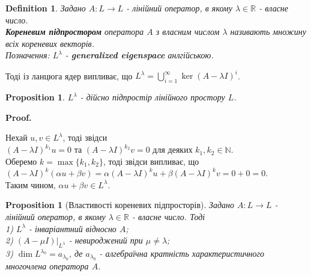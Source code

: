 \documentclass[a4paper, 10pt]{article}
\makeatletter
\theoremstyle{theoremdd}
\newtheorem{definition}[theorem]{Definition}
\newtheorem{proposition}[theorem]{Proposition}
\renewenvironment{proof}[1][Proof.\\]{\par
\pushQED{\hfill \qed}%
\normalfont \topsep6\p@\@plus6\p@\relax
\trivlist
\item\relax
{\bfseries
#1\@addpunct{.}}\hspace\labelsep\ignorespaces
}{%
\popQED\endtrivlist\@endpefalse
}
\makeatother
\begin{document}
\begin{definition}
Задано $A \colon L \to L$ - лінійний оператор, в якому $\lambda \in \mathbb{R}$ - власне число.\\
\textbf{Кореневим підпростором} оператора $A$ з власним числом $\lambda$ називають множину всіх кореневих векторів.\\
Позначення: $L^\lambda$ - \textbf{generalized eigenspace} анлгійською.
\end{definition}
\noindent
Тоді із ланцюга ядер випливає, що $L^\lambda = \displaystyle\bigcup_{i=1}^\infty \ker (A-\lambda I)^i$.

\begin{proposition}
$L^\lambda$ - дійсно підпростір лінійного простору $L$.
\end{proposition}

\begin{proof}
Нехай $u,v \in L^\lambda$, тоді звідси\\
$(A-\lambda I)^{k_1}u = 0$ та $(A-\lambda I)^{k_2}v = 0$ для деяких $k_1,k_2 \in \mathbb{N}$.\\
Оберемо $k = \max \{k_1,k_2\}$, тоді звідси випливає, що\\
$(A-\lambda I)^k (\alpha u + \beta v) = 
\alpha (A-\lambda I)^k u + \beta (A-\lambda I)^k v = 0 + 0 = 0$.\\
Таким чином, $\alpha u + \beta v \in L^\lambda$.
\end{proof}

\iffalse
\begin{proposition}
Задано $A: L \to L$ - лінійний оператор та $\dim L = n$. Тоді\\
$\{0\} \subset \underset{=L_\lambda}{\ker (A-\lambda I)} \subset \ker (A-\lambda I)^2 \subset \dots \subset \underset{=L^\lambda}{\ker (A-\lambda I)^n}$.\\
І далі $\ker (A-\lambda I)^n = \ker(A-\lambda I)^{n+1} = \ker(A-\lambda I)^{n+2} = \dots$.
\end{proposition}

\begin{proof}
\textit{Не до кінця зрозумів.}
\end{proof}
\fi

\begin{proposition}[Властивості кореневих підпросторів]
Задано $A \colon L \to L$ - лінійний оператор, в якому $\lambda \in \mathbb{R}$ - власне число. Тоді\\
1) $L^\lambda$ - інваріантний відносно $A$;\\
2) $(A-\mu I)|_{L^\lambda}$ - невироджений при $\mu \neq \lambda$;\\
3) $\dim L^{\lambda_0} = a_{\lambda_0}$, де $a_{\lambda_0}$ - алгебраїчна кратність характеристичного многочлена оператора $A$.
\end{proposition}
\end{document}
